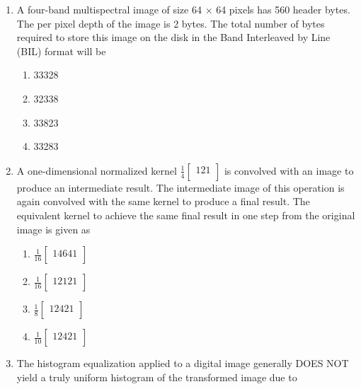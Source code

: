 \documentclass[12pt]{article}
\begin{document}
\begin{enumerate}
\item A four-band multispectral image of size 64 × 64 pixels has 560 header bytes. The
per pixel depth of the image is 2 bytes. The total number of bytes required to store
this image on the disk in the Band Interleaved by Line (BIL) format will be  
\begin{enumerate}
    \item 33328 
   \item 32338 
   \item 33823 
   \item 33283
\end{enumerate}

\item A one-dimensional normalized kernel $ \frac{1}{4} [\begin{smallmatrix}1   2   1\\ \end{smallmatrix} ] $ is convolved with an image to produce an intermediate result. The intermediate image of this operation is again convolved with the same kernel to produce a final result. The equivalent kernel to achieve the same final result in one step from the original image is given as

\begin{enumerate}
  \item $ \frac{1}{16}[\begin{smallmatrix}1   4   6 4 1\\ \end{smallmatrix} ] $ 
   \item $ \frac{1}{16}[ \begin{smallmatrix}1   2   1 2 1\\ \end{smallmatrix} ] $ 
   \item $ \frac{1}{8}[ \begin{smallmatrix}1   2   4 2 1\\ \end{smallmatrix} ] $ 
   \item $ \frac{1}{10}[ \begin{smallmatrix}1   2   4 2 1\\ \end{smallmatrix} ] $
\end{enumerate}

\item The histogram equalization applied to a digital image generally DOES NOT yield
a truly uniform histogram of the transformed image due to


\end{enumerate}
\end{document}
